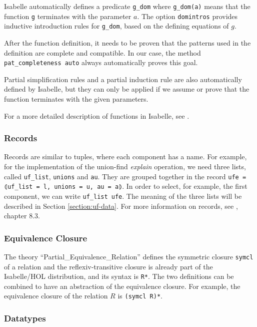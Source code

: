 Isabelle automatically defines a predicate \lstinline|g_dom| where \lstinline{g_dom(a)} means that the function \lstinline|g| terminates with the parameter $a$.
The option \lstinline{domintros} provides inductive introduction rules for \lstinline|g_dom|, based on the defining equations of $g$.

After the function definition, it needs to be proven that the patterns used in the definition are complete and compatible. In our case, the method \lstinline|pat_completeness auto| always automatically proves this goal.

Partial simplification rules and a partial induction rule are also automatically defined by Isabelle, but they can only be applied if we assume or prove that the function terminates with the given parameters.

For a more detailed description of functions in Isabelle, see \cite{functions}.

\subsubsection{Records}

Records are similar to tuples, where each component has a name. For example, for the implementation of the union-find \emph{explain} operation, we need three lists, called \lstinline|uf_list|, \lstinline|unions| and \lstinline|au|.
They are grouped together in the record \lstinline{ufe = ⦇uf_list = l, unions = u, au = a⦈}. In order to select, for example, the first component, we can write \lstinline{uf_list ufe}. The meaning of the three lists will be described in Section \ref{section:uf-data}.
For more information on records, see \cite{isabelle}, chapter 8.3.

\subsubsection{Equivalence Closure}

The theory ``Partial\_Equivalence\_Relation''\cite{Collections-AFP} defines the symmetric closure \lstinline{symcl} of a relation and the reflexiv-transitive closure is already part of the Isabelle/HOL distribution, and its syntax is \lstinline{R*}.
The two definitions can be combined to have an abstraction of the equivalence closure.
For example, the equivalence closure of the relation $R$ is \lstinline{(symcl R)*}.

\subsubsection{Datatypes}
\label{subsubsection:datatypes}

